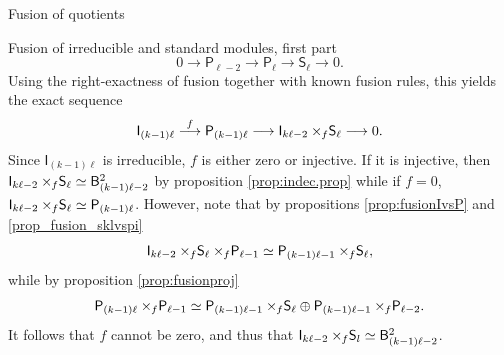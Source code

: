 \documentclass[reqno]{amsart}
\newcommand{\ds}[1]{\mathsf S_{#1}}
\newcommand{\dl}[1]{\mathsf I_{#1}}
\newcommand{\dP}[1]{\mathsf P_{#1}}
\newcommand{\xf}{\times\hspace{-0.27em}_f}
\newcommand{\B}[2]{\mathsf{B}^{#1}_{#2}}
\newcommand{\lc}{\ell}
\begin{document}
\begin{section}{Fusion of quotients}
\begin{subsection}{Fusion of irreducible and standard modules, first part}
\begin{equation*}
0 \longrightarrow \dP{\lc-2} \longrightarrow \dP{\lc} \longrightarrow \ds{\lc} \longrightarrow 0.
\end{equation*}
Using the right-exactness of fusion together with known fusion rules, this yields the exact sequence
\begin{equation*}
\dl{(k-1)\lc} \overset{f}{\longrightarrow} \dP{(k-1)\lc} \longrightarrow \dl{k\lc-2} \xf \ds{\lc} \longrightarrow 0.
\end{equation*}
Since $\dl{(k-1)\lc}$ is irreducible, $f$ is either zero or injective. If it is injective, then $\dl{k\lc-2} \xf \ds{\ell} \simeq \B{2}{(k-1)\lc-2}$ by proposition \ref{prop:indec.prop} while if $f=0$, $\dl{k\lc-2} \xf \ds{\lc} \simeq \dP{(k-1)\lc}$. However, note that by propositions \ref{prop:fusionIvsP} and \ref{prop_fusion_sklvspi}
\begin{equation*}
\dl{k \lc -2} \xf \ds{\lc} \xf \dP{\lc-1} \simeq \dP{(k-1)\lc-1} \xf \ds{\lc},
\end{equation*}
while by proposition \ref{prop:fusionproj}
\begin{equation*}
\dP{(k-1)\lc} \xf \dP{\lc-1} \simeq \dP{(k-1)\lc-1} \xf \ds{\lc} \oplus \dP{(k-1)\lc-1} \xf \dP{\lc-2}. 
\end{equation*}
It follows that $f$ cannot be zero, and thus that $\dl{k\lc-2} \xf \ds{l} \simeq \B{2}{(k-1)\lc-2}$.


\end{subsection}
\end{section}
\end{document}
